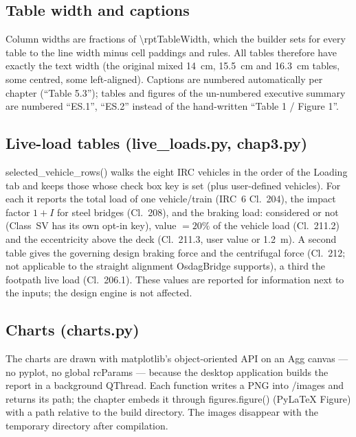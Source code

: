 \documentclass[10pt,a4paper]{article}
\newcommand{\file}[1]{{\footnotesize\ttfamily #1}}
\newcommand{\code}[1]{{\small\ttfamily #1}}
\begin{document}
\subsection{Table width and captions}

Column widths are fractions of \code{\textbackslash rptTableWidth}, which the builder sets for every table to the line width minus cell paddings and rules. All tables therefore have exactly the text width (the original mixed 14~cm, 15.5~cm and 16.3~cm tables, some centred, some left-aligned). Captions are numbered automatically per chapter (``Table 5.3''); tables and figures of the un-numbered executive summary are numbered ``ES.1'', ``ES.2'' instead of the hand-written ``Table 1 / Figure 1''.

\subsection{Live-load tables (\file{live\_loads.py}, \file{chap3.py})}

\code{selected\_vehicle\_rows()} walks the eight IRC vehicles in the order of the Loading tab and keeps those whose check box key is set (plus user-defined vehicles). For each it reports the total load of one vehicle/train (IRC~6 Cl.~204), the impact factor $1+I$ for steel bridges (Cl.~208), and the braking load: considered or not (Class~SV has its own opt-in key), value $=20\%$ of the vehicle load (Cl.~211.2) and the eccentricity above the deck (Cl.~211.3, user value or 1.2~m). A second table gives the governing design braking force and the centrifugal force (Cl.~212; not applicable to the straight alignment OsdagBridge supports), a third the footpath live load (Cl.~206.1). These values are reported for information next to the inputs; the design engine is not affected.

\subsection{Charts (\file{charts.py})}

The charts are drawn with matplotlib's object-oriented API on an Agg canvas --- no \code{pyplot}, no global rcParams --- because the desktop application builds the report in a background \code{QThread}. Each function writes a PNG into \code{<build dir>/images} and returns its path; the chapter embeds it through \code{figures.figure()} (PyLaTeX \code{Figure}) with a path relative to the build directory. The images disappear with the temporary directory after compilation.
\end{document}

